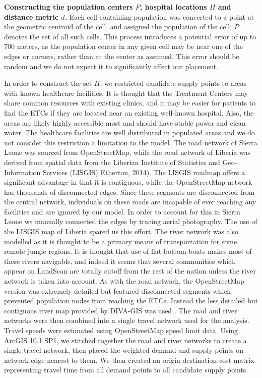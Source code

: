 \noindent
\textbf{Constructing the population centers $P$, hospital locations $H$ and distance metric $d$.}
Each cell containing population was converted to a point at the geometric centroid of the cell, 
and assigned the population of the cell; $P$ denotes the set of all such cells.
This process introduces a potential error of up to 700 meters, as the 
population center in any given cell may be near one of the edges or corners, rather than at the 
center as assumed. This error should be random and we do not expect it to significantly affect our placement. 

In order to construct the set $H$,
we restricted candidate supply points to areas with known healthcare facilities. 
It is thought that the Treatment Centers may share common resources with existing clinics, and it may be easier for patients to find the ETCs if they are located near an existing well-known hospital. Also, the areas are likely highly accessible most and should have stable power and clean water. The healthcare facilities are well distributed in populated areas and we do not consider this restriction a limitation to the model. 
The road network of Sierra Leone was sourced from OpenStreetMap,
while the road network of Liberia was derived from spatial data from the Liberian Institute of Statistics and Geo-Information Services (LISGIS) Etherton, 2014). The LISGIS roadmap offers a significant advantage in that it is contiguous, while the OpenStreetMap network has thousands of disconnected edges. Since these segments are disconnected from the central network, individuals on these roads are incapable of ever reaching any facilities and are ignored by our model. In order to account for this in Sierra Leone we manually connected the edges by tracing aerial photography. The use of the LISGIS map of Liberia spared us this effort. The river network was also modelled as it is thought to be a primary means of transportation for some remote jungle regions. It is thought that use of flat-bottom boats makes most of these rivers navigable, and indeed it seems that several communities which appear on LandScan are totally cutoff from the rest of the nation unless the river network is taken into account. As with the road network, the OpenStreetMap version was extremely detailed but featured disconnected segments which prevented population nodes from reaching the ETCs. Instead the less detailed but contiguous river map provided by DIVA-GIS was used \cite{DIVA}. The road and river networks were then combined into a single travel network used for the analysis. Travel speeds were estimated using OpenStreetMap speed limit data. 
Using ArcGIS 10.1 SP1, we stitched together the road and river networks to create a single travel network, then placed the weighted demand and supply points on network edge nearest to them. We then created an origin-destination cost matrix representing travel time from all demand points to all candidate supply points.


